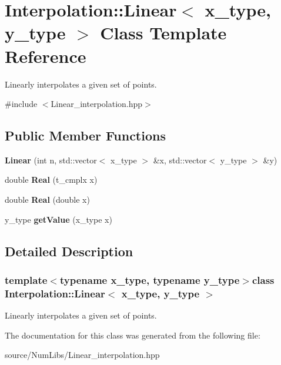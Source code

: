 \hypertarget{class_interpolation_1_1_linear}{\section{Interpolation\-:\-:Linear$<$ x\-\_\-type, y\-\_\-type $>$ Class Template Reference}
\label{class_interpolation_1_1_linear}
}


Linearly interpolates a given set of points.  




{\ttfamily \#include $<$Linear\-\_\-interpolation.\-hpp$>$}

\subsection*{Public Member Functions}
\begin{DoxyCompactItemize}
\item 
\hypertarget{class_interpolation_1_1_linear_a931383bc431497777e5e0f8c3b43dff3}{{\bfseries Linear} (int n, std\-::vector$<$ x\-\_\-type $>$ \&x, std\-::vector$<$ y\-\_\-type $>$ \&y)}\label{class_interpolation_1_1_linear_a931383bc431497777e5e0f8c3b43dff3}

\item 
\hypertarget{class_interpolation_1_1_linear_a741729571890e0121a85834ca93bf52a}{double {\bfseries Real} (t\-\_\-cmplx x)}\label{class_interpolation_1_1_linear_a741729571890e0121a85834ca93bf52a}

\item 
\hypertarget{class_interpolation_1_1_linear_a5ebf069101fb53752f9591c6b82c3a15}{double {\bfseries Real} (double x)}\label{class_interpolation_1_1_linear_a5ebf069101fb53752f9591c6b82c3a15}

\item 
\hypertarget{class_interpolation_1_1_linear_a0293e0e3e3ccff56c979ce054ea6c023}{y\-\_\-type {\bfseries get\-Value} (x\-\_\-type x)}\label{class_interpolation_1_1_linear_a0293e0e3e3ccff56c979ce054ea6c023}

\end{DoxyCompactItemize}


\subsection{Detailed Description}
\subsubsection*{template$<$typename x\-\_\-type, typename y\-\_\-type$>$class Interpolation\-::\-Linear$<$ x\-\_\-type, y\-\_\-type $>$}

Linearly interpolates a given set of points. 

The documentation for this class was generated from the following file\-:\begin{DoxyCompactItemize}
\item 
source/\-Num\-Libs/Linear\-\_\-interpolation.\-hpp\end{DoxyCompactItemize}
